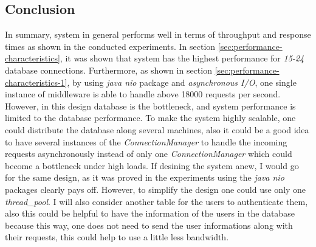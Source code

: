 \documentclass[11pt]{article}
\begin{document}
\subsection{Conclusion}\label{sec:conclusion}
In summary, system in general performs well in terms of throughput and response times as shown in the conducted experiments.
In section \ref{sec:performance-characteristics}, it was shown that system has the highest performance for \emph{15-24}
database connections. Furthermore, as shown in section \ref{sec:performance-characteristics-1}, by using 
\emph{java nio} package and \emph{asynchronous I/O}, one single instance of middleware is able to handle above 
18000 requests per second. However, in this design database is the bottleneck, and system performance is limited 
to the database performance. To make the system highly scalable, one could distribute the database
along several machines, also it could be a good idea to have several instances of the 
\emph{ConnectionManager} to handle the incoming requests asynchronously instead of only one \emph{ConnectionManager} which 
could become a bottleneck under high loads.
If desining the system anew, I would go for the same design, as it was proved in the experiments using the 
\emph{java nio} packages clearly pays off. However, to simplify the design one could use only one \emph{thread\_pool}.
I will also consider another table for the users to authenticate them, also this could be helpful to 
have the information of the users in the database because this way, one does not need to send the user informations
along with their requests, this could help to use a little less bandwidth. 
\end{document}
